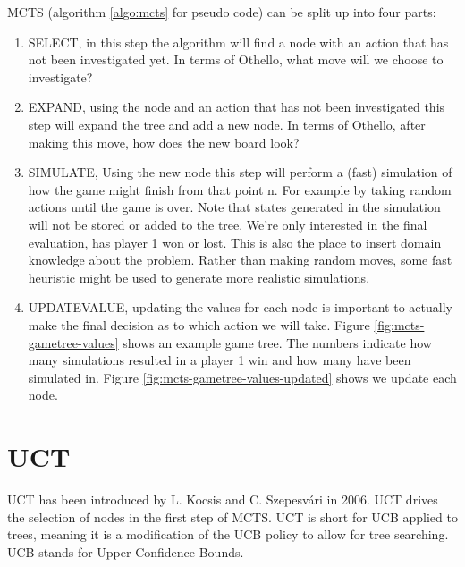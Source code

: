 \documentclass[
11pt, %
english, %
singlespacing, %
headsepline, %
]{MastersDoctoralThesis} %
\begin{document}
MCTS (algorithm \ref{algo:mcts} for pseudo code) can be split up into four parts:
\begin{enumerate}
    \item SELECT, in this step the algorithm will find a node with an action that has not been investigated yet. In terms of Othello, what move will we choose to investigate?
    \item EXPAND, using the node and an action that has not been investigated this step will expand the tree and add a new node. In terms of Othello, after making this move, how does the new board look?
    \item SIMULATE, Using the new node this step will perform a (fast) simulation of how the game might finish from that point n. For example by taking random actions until the game is over. Note that states generated in the simulation will not be stored or added to the tree. We're only interested in the final evaluation, has player 1 won or lost. This is also the place to insert domain knowledge about the problem. Rather than making random moves, some fast heuristic might be used to generate more realistic simulations.
    \item UPDATEVALUE, updating the values for each node is important to actually make the final decision as to which action we will take. Figure \ref{fig:mcts-gametree-values} shows an example game tree. The numbers indicate how many simulations resulted in a player 1 win and how many have been simulated in. Figure \ref{fig:mcts-gametree-values-updated} shows we update each node. 
\end{enumerate}

\section{UCT}
UCT has been introduced by L. Kocsis and C. Szepesv{\'a}ri in 2006\cite{Kocsis:2006}. UCT drives the selection of nodes in the first step of MCTS. UCT is short for UCB applied to trees, meaning it is a modification of the UCB policy to allow for tree searching. UCB stands for Upper Confidence Bounds.
\end{document}
